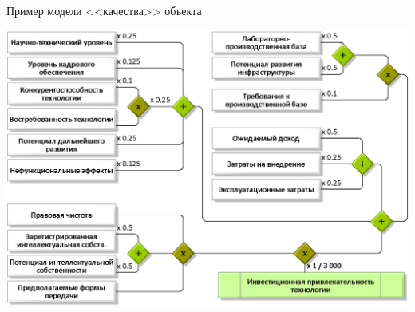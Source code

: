\begin{frame}{Пример модели <<качества>> объекта}
	\begin{center}
		\includegraphics[width=0.85\linewidth]{./pic/schemeF2}
	\end{center}
\end{frame} %

